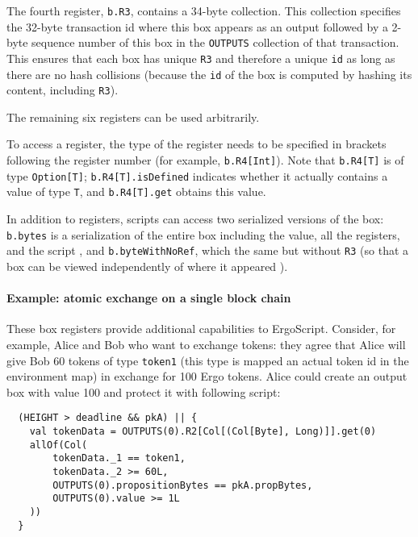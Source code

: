 \documentclass[11pt]{article}
\newcommand{\authnote}[2]{\marginpar{\parbox{\marginparwidth}{\tiny %
  \textsf{#1 {\textcolor{blue}{notes: #2}}}}}%
  \textcolor{blue}{\textbf{\dag}}}
\newcommand{\authnote}[2]{
  \textsf{#1 \textcolor{blue}{: #2}}}
\newcommand{\authnote}[2]{}
\newcommand{\lnote}[1]{{\authnote{\textcolor{orange}{Leo notes}}{#1}}}
\newcommand{\knote}[1]{{\authnote{\textcolor{green}{kushti notes}}{#1}}}
\newcommand{\langname}{ErgoScript\xspace}
\begin{document}
The fourth register, \texttt{b.R3}, contains a 34-byte collection. This collection specifies the 32-byte transaction id \lnote{how is transaction id computed?} where this box appears as an output followed by a 2-byte sequence number of this box in the \texttt{OUTPUTS} collection of that transaction. This ensures that each box has unique \texttt{R3} and therefore a unique \texttt{id} as long as there are no hash collisions (because the \texttt{id} of the box is computed by hashing its content, including \texttt{R3}).

The remaining six registers can be used arbitrarily. 

To access a register, the type of the register needs to be specified in brackets following the register number (for example, \texttt{b.R4[Int]}). Note that \texttt{b.R4[T]} is of type \texttt{Option[T]}; \texttt{b.R4[T].isDefined} indicates whether it actually contains a value of type \texttt{T}, and \texttt{b.R4[T].get} obtains this value.

In addition to registers, scripts can access two serialized versions of the box: \texttt{b.bytes} is a serialization of the entire box including the value, all the registers, and the script \lnote{anything else?}, and \texttt{b.byteWithNoRef}, which the same but without \texttt{R3} (so that a box can be viewed independently of where it appeared \lnote{is there a good reason someone would need this? Can we explain it here?} \knote{As output id and bytes are not predictable before spending transaction is generated, if a box is willing to require spending transaction to create box w. some semantics, the only way to do it is to use box bytes cleared from transaction-specific information. A simple example of such requirement is hash(Outputs(0).bytesWithNoRef) == "0x..."}). \lnote{Are there any other box properties that scripts can access?}

\paragraph{Example: atomic exchange on a single block chain}
These box registers provide additional capabilities to \langname. Consider, for example, Alice and Bob who want to exchange tokens: they agree that  Alice will give Bob 60 tokens of type \texttt{token1} (this type is mapped an actual token id in the environment map) in exchange for 100 Ergo tokens. Alice could create an output box with value 100 and protect it with following script:

\begin{verbatim}
  (HEIGHT > deadline && pkA) || {
    val tokenData = OUTPUTS(0).R2[Col[(Col[Byte], Long)]].get(0)
    allOf(Col(
        tokenData._1 == token1,
        tokenData._2 >= 60L,
        OUTPUTS(0).propositionBytes == pkA.propBytes,
        OUTPUTS(0).value >= 1L
    ))
  }
\end{verbatim}
\end{document}
